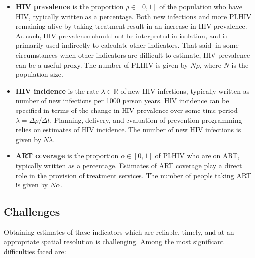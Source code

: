 \documentclass[a4paper, nobind]{templates/ociamthesis}
\providecommand{\tightlist}{%
  \setlength{\itemsep}{0pt}\setlength{\parskip}{0pt}}
\begin{document}
\begin{itemize}
\tightlist
\item
  \textbf{HIV prevalence} is the proportion \(\rho \in [0, 1]\) of the population who have HIV, typically written as a percentage.
  Both new infections and more PLHIV remaining alive by taking treatment result in an increase in HIV prevalence.
  As such, HIV prevalence should not be interpreted in isolation, and is primarily used indirectly to calculate other indicators.
  That said, in some circumstances when other indicators are difficult to estimate, HIV prevalence can be a useful proxy.
  The number of PLHIV is given by \(N\rho\), where \(N\) is the population size.
\item
  \textbf{HIV incidence} is the rate \(\lambda \in \mathbb{R}\) of new HIV infections, typically written as number of new infections per 1000 person years.
  HIV incidence can be specified in terms of the change in HIV prevalence over some time period \(\lambda = \Delta \rho / \Delta t\).
  Planning, delivery, and evaluation of prevention programming relies on estimates of HIV incidence.
  The number of new HIV infections is given by \(N \lambda\).
\item
  \textbf{ART coverage} is the proportion \(\alpha \in [0, 1]\) of PLHIV who are on ART, typically written as a percentage.
  Estimates of ART coverage play a direct role in the provision of treatment services.
  The number of people taking ART is given by \(N \alpha\).
\end{itemize}

\hypertarget{challenges}{%
\subsection{Challenges}\label{challenges}}

Obtaining estimates of these indicators which are reliable, timely, and at an appropriate spatial resolution is challenging.
Among the most significant difficulties faced are:
\end{document}
